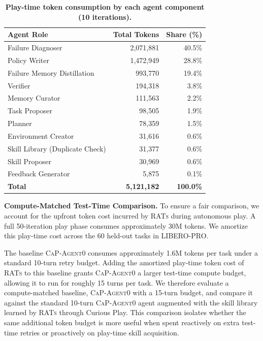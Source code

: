 \documentclass{llmxive}
\begin{document}
\begin{table}[htbp]
    \centering
    \begin{tabular}{lrr}
        \toprule
        \textbf{Agent Role} & \textbf{Total Tokens} & \textbf{Share (\%)} \\
        \midrule
        Failure Diagnoser & 2,071,881 & 40.5\% \\
        Policy Writer & 1,472,949 & 28.8\% \\
        Failure Memory Distillation & 993,770 & 19.4\% \\
        Verifier & 194,318 & 3.8\% \\
        Memory Curator & 111,563 & 2.2\% \\
        Task Proposer & 98,505 & 1.9\% \\
        Planner & 78,359 & 1.5\% \\
        Environment Creator & 31,616 & 0.6\% \\
        Skill Library (Duplicate Check) & 31,377 & 0.6\% \\
        Skill Proposer & 30,969 & 0.6\% \\
        Feedback Generator & 5,875 & 0.1\% \\
        \midrule
        \textbf{Total} & \textbf{5,121,182} & \textbf{100.0\%} \\
        \bottomrule
    \end{tabular}
\caption{\textbf{Play-time token consumption by each agent component (10 iterations).}}
\label{tab:play_time_tokens}
\end{table}

\textbf{Compute-Matched Test-Time Comparison.} To ensure a fair comparison, we account for the
upfront token cost incurred by \textsc{RATs} during autonomous play. A full 50-iteration play phase
consumes approximately 30M tokens. We amortize this play-time cost across the 60 held-out tasks in
LIBERO-PRO.

The baseline \textsc{CaP-Agent0} consumes approximately 1.6M tokens per task under a standard
10-turn retry budget. Adding the amortized play-time token cost of \textsc{RATs} to this baseline
grants \textsc{CaP-Agent0} a larger test-time compute budget, allowing it to run for roughly 15 turns
per task. We therefore evaluate a compute-matched baseline, \textsc{CaP-Agent0} with a 15-turn
budget, and compare it against the standard 10-turn \textsc{CaP-Agent0} agent augmented with the
skill library learned by \textsc{RATs} through Curious Play. This comparison isolates whether the
same additional token budget is more useful when spent reactively on extra test-time retries or
proactively on play-time skill acquisition.
\end{document}
